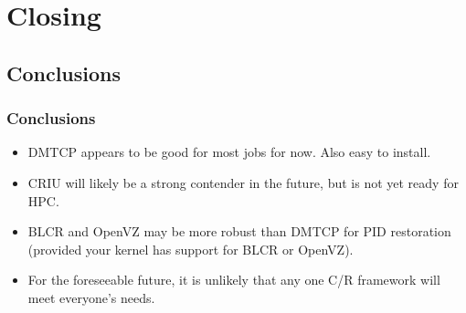 \documentclass[compress]{beamer}
\begin{document}




\section{Closing}           %


\subsection{Conclusions}
\begin{frame}
\frametitle{Conclusions}

\begin{itemize}
\item DMTCP appears to be good for most jobs for now. Also easy to install.
\item CRIU will likely be a strong contender in the future, but is not
yet ready for HPC.
\item BLCR and OpenVZ may be more robust than DMTCP for PID restoration (provided
your kernel has support for BLCR or OpenVZ).
\item For the foreseeable future, it is unlikely that any one C/R framework
will meet everyone's needs.


\end{itemize}

\end{frame}

\end{document}
